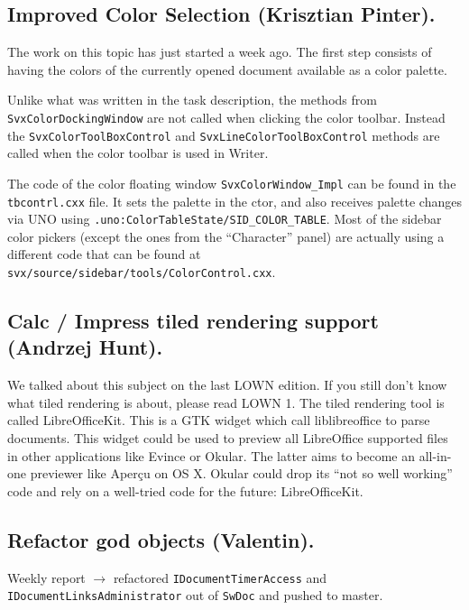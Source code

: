 \documentclass{article}
\begin{document}
\subsection{Improved Color Selection (Krisztian Pinter).}

The work on this topic has just started a week ago. The first step consists of having the colors of the currently opened document available as a color palette.

Unlike what was written in the task description, the methods from \lstinline|SvxColorDockingWindow|\cite{gsocColorSelectionMethod1} are not called when clicking the color toolbar. Instead the \lstinline|SvxColorToolBoxControl|\cite{gsocColorSelectionMethod2} and \lstinline|SvxLineColorToolBoxControl| methods are called when the color toolbar is used in Writer\cite{gsocColorSelection}.

The code of the color floating window \lstinline|SvxColorWindow_Impl| can be found in the \lstinline|tbcontrl.cxx| file. It sets the palette in the ctor, and also receives palette changes via UNO using 
\lstinline|.uno:ColorTableState/SID_COLOR_TABLE|.
Most of the sidebar color pickers (except the ones from 
the ``Character'' panel) are actually using a different code that can be found 
at \lstinline|svx/source/sidebar/tools/ColorControl.cxx|.

\subsection{Calc / Impress tiled rendering support (Andrzej Hunt).}

We talked about this subject on the last LOWN edition. If you still don't know what tiled rendering is about, please read LOWN 1. The tiled rendering tool is called LibreOfficeKit. This is a GTK widget which call liblibreoffice to parse documents. This widget could be used to preview all LibreOffice supported files in other applications like Evince or Okular. The latter aims to become an all-in-one previewer like Aperçu on OS X. Okular could drop its ``not so well working'' code and rely on a well-tried code for the future: LibreOfficeKit\cite{libreofficeKit}\cite{gsocLibreOfficeKit}.

\subsection{Refactor god objects (Valentin).}

Weekly report $\rightarrow$ refactored \lstinline|IDocumentTimerAccess| and \lstinline|IDocumentLinksAdministrator| out of \lstinline|SwDoc| and pushed to master.
\end{document}
